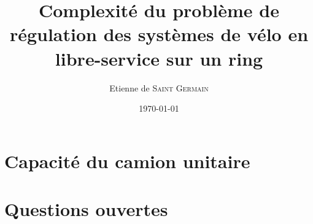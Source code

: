 \documentclass[twoside,11pt,openany,a4paper]{rapport}
\begin{document}
\title{Complexité du problème de régulation des systèmes de vélo en libre-service sur un ring}
\author{Etienne de \textsc{Saint Germain}}
\date{\today}



\cleardoublepage







\tableofcontents
{}
\listoffigures
{}



\cleardoublepage









\chapter{Capacité du camion unitaire}

\chapter{Questions ouvertes}






\backmatter
\end{document}
